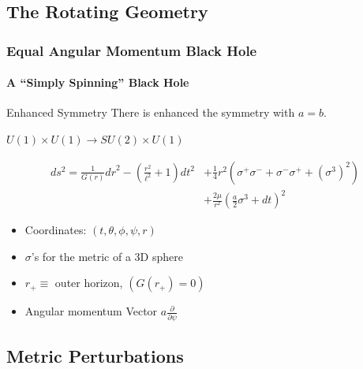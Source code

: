 \documentclass[aspectratio=169, xcolor=dvipsnames]{beamer}
\begin{document}
\subsection{The Rotating Geometry}

\begin{frame}[squeeze]
  \frametitle{Equal Angular Momentum Black Hole}
  \framesubtitle{A ``Simply Spinning'' Black Hole}

  \begin{block}{Enhanced Symmetry}
    There is enhanced the symmetry with $a=b$.
    \begin{center}$U(1)\times U(1) \longrightarrow SU(2)\times U(1)$ \end{center}
  \end{block}

  \begin{equation*}
    \begin{aligned}
      d s^2=\frac 1{G(r)}{dr}^2-\left(\frac{r^2}{\ell^2}+1\right)dt^2&+\frac 14 r^2 \left(\sigma^+ \sigma^- +\sigma^- \sigma^+ +(\sigma^3)^2\right) \\ &+\frac{2 \mu  }{r^2} \left(\frac a2 \sigma^3+dt\right)^2
    \end{aligned}
  \end{equation*}

  \begin{itemize}
    \item Coordinates: $(t, \theta, \phi, \psi, r)$
    \item $\sigma$'s for the metric of a 3D sphere
    \item $r_+ \equiv$ outer horizon, $\left(G(r_+)=0\right)$
    \item Angular momentum Vector $a\frac\partial{\partial\psi}$
  \end{itemize}

\end{frame}

\subsection{Metric Perturbations}
\end{document}
